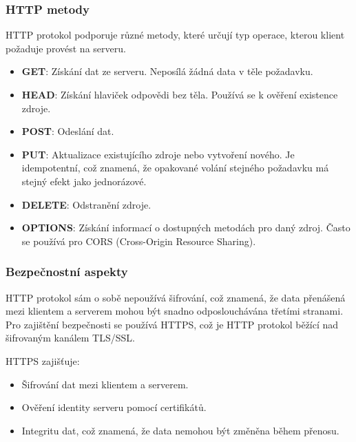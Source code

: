 \subsubsection*{HTTP metody}
HTTP protokol podporuje různé metody, které určují typ operace, kterou klient požaduje provést na serveru. 

\begin{itemize}
    \item \textbf{GET}: Získání dat ze serveru. Neposílá žádná data v těle požadavku.
    \item \textbf{HEAD}: Získání hlaviček odpovědi bez těla. Používá se k ověření existence zdroje.
    \item \textbf{POST}: Odeslání dat.
    \item \textbf{PUT}: Aktualizace existujícího zdroje nebo vytvoření nového. Je idempotentní, což znamená, že opakované volání stejného požadavku má stejný efekt jako jednorázové.
    \item \textbf{DELETE}: Odstranění zdroje.
    \item \textbf{OPTIONS}: Získání informací o dostupných metodách pro daný zdroj. Často se používá pro CORS (Cross-Origin Resource Sharing).
\end{itemize}

\subsubsection*{Bezpečnostní aspekty}

HTTP protokol sám o sobě nepoužívá šifrování, což znamená, že data přenášená mezi klientem a serverem mohou být snadno odposlouchávána třetími stranami. Pro zajištění bezpečnosti se používá HTTPS, což je HTTP protokol běžící nad šifrovaným kanálem TLS/SSL.

HTTPS zajišťuje:
\begin{itemize}
    \item Šifrování dat mezi klientem a serverem.
    \item Ověření identity serveru pomocí certifikátů.
    \item Integritu dat, což znamená, že data nemohou být změněna během přenosu.
\end{itemize}
